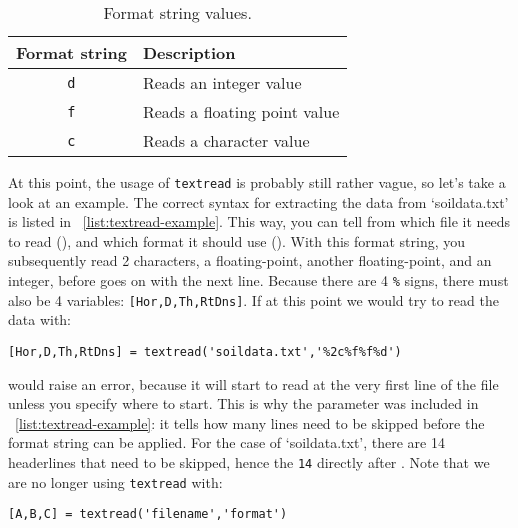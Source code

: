 \begin{table}[ht]
\vspace{1em}
\caption{Format string values.}
\label{tab:format-string-values}
\vspace{-0.25em}
\centering
\begin{tabular}{|c|l|}
\hline
\textbf{Format string}&\textbf{Description}\\
\hline
{\tt d}&Reads an integer value\\
\hline
{\tt f}&Reads a floating point value\\
\hline
{\tt c}&Reads a character value\\
\hline
\end{tabular}
\end{table}
At this point, the usage of {\tt textread} is probably still rather vague, so let's take a look at an example. The correct syntax for extracting the data from `soildata.txt' is listed in \lstlistingname~\ref{list:textread-example}.
This way, you can tell \MATLAB{} from which file it needs to read ({\tt {}}), and which format it should use ({\tt {}}). With this format string, you subsequently read 2 characters, a floating-point, another floating-point, and an integer, before \MATLAB{} goes on with the next line. Because there are 4 {\tt \%} signs, there must also be 4 variables: {\tt {[Hor,D,Th,RtDns]}}. If at this point we would try to read the data with:
\begin{lstlisting}[numbers=none]
[Hor,D,Th,RtDns] = textread('soildata.txt','%2c%f%f%d')
\end{lstlisting}
\MATLAB{} would raise an error, because it will start to read at the very first line of the file unless you specify where to start. This is why the parameter {\tt {}} was included in \lstlistingname~\ref{list:textread-example}: it tells \MATLAB{} how many lines need to be skipped before the format string can be applied. For the case of `soildata.txt', there are 14 headerlines that need to be skipped, hence the {\tt 14} directly after {\tt {}}. Note that we are no longer using {\tt textread} with:
\begin{lstlisting}[numbers=none]
[A,B,C] = textread('filename','format')
\end{lstlisting}
